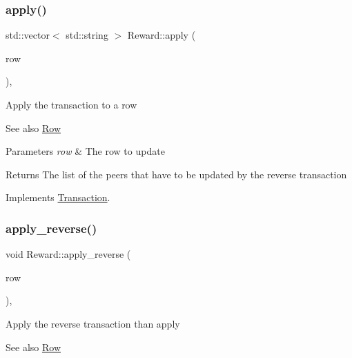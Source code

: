 \subsubsection{\texorpdfstring{apply()}{apply()}}
{\footnotesize\ttfamily std\+::vector$<$ std\+::string $>$ Reward\+::apply (\begin{DoxyParamCaption}\item[{\mbox{\hyperlink{classRow}{Row}} $\ast$}]{row }\end{DoxyParamCaption})\hspace{0.3cm}{\ttfamily [override]}, {\ttfamily [virtual]}}

Apply the transaction to a row \begin{DoxySeeAlso}{See also}
\mbox{\hyperlink{classRow}{Row}}
\end{DoxySeeAlso}

\begin{DoxyParams}{Parameters}
{\em row} & The row to update \\
\hline
\end{DoxyParams}
\begin{DoxyReturn}{Returns}
The list of the peers that have to be updated by the reverse transaction 
\end{DoxyReturn}


Implements \mbox{\hyperlink{classTransaction_a6ea269280c8cc641878f6e5775f270ca}{Transaction}}.

\mbox{\label{classReward_a494c9d6e0a220729f675fd6131cfb9af}} 
\subsubsection{\texorpdfstring{apply\+\_\+reverse()}{apply\_reverse()}}
{\footnotesize\ttfamily void Reward\+::apply\+\_\+reverse (\begin{DoxyParamCaption}\item[{\mbox{\hyperlink{classRow}{Row}} $\ast$}]{row }\end{DoxyParamCaption})\hspace{0.3cm}{\ttfamily [final]}, {\ttfamily [virtual]}}

Apply the reverse transaction than apply \begin{DoxySeeAlso}{See also}
\mbox{\hyperlink{classRow}{Row}}
\end{DoxySeeAlso}

